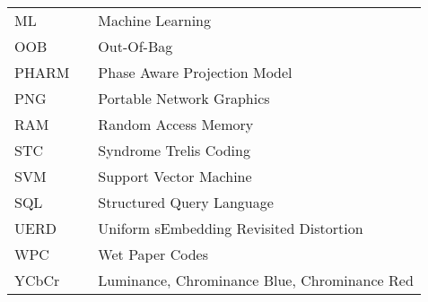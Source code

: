 {\begin{tabular}{l l l}
    ML          && Machine Learning\\
    OOB         && Out-Of-Bag\\
    PHARM       && Phase Aware Projection Model\\
    PNG         && Portable Network Graphics\\
    RAM         && Random Access Memory\\
    STC        && Syndrome Trelis Coding\\
    SVM       && Support Vector Machine\\
    SQL        & & Structured Query Language\\
    UERD       & & Uniform sEmbedding Revisited Distortion\\ 
    WPC        && Wet Paper Codes\\
    YCbCr      &&Luminance, Chrominance Blue, Chrominance Red\\

\end{tabular} }

